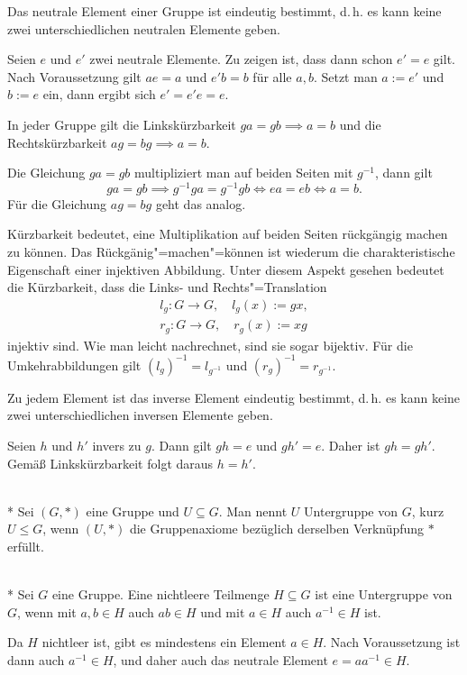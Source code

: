 \begin{Satz} Das neutrale Element einer Gruppe ist eindeutig bestimmt,
d.\,h. es kann keine zwei unterschiedlichen neutralen Elemente geben.
\end{Satz}
 Seien $e$ und $e'$ zwei neutrale Elemente.
Zu zeigen ist, dass dann schon $e'=e$ gilt. Nach Voraussetzung
gilt $ae=a$ und $e'b=b$ für alle $a,b$. Setzt man $a:=e'$ und
$b:=e$ ein, dann ergibt sich $e' = e'e = e.$\;\qedsymbol

\begin{Satz}
In jeder Gruppe gilt die Linkskürzbarkeit $ga=gb\implies a=b$
und die Rechtskürzbarkeit $ag=bg\implies a=b$.
\end{Satz}
 Die Gleichung $ga=gb$ multipliziert man auf beiden
Seiten mit $g^{-1}$, dann gilt
\[ga=gb \implies g^{-1}ga=g^{-1}gb \iff ea=eb \iff a=b.\]
Für die Gleichung $ag=bg$ geht das analog.\;\qedsymbol

Kürzbarkeit bedeutet, eine Multiplikation auf beiden Seiten
rückgängig machen zu können. Das Rückgänig"=machen"=können
ist wiederum die charakteristische Eigenschaft einer injektiven
Abbildung. Unter diesem Aspekt gesehen bedeutet die Kürzbarkeit,
dass die Links- und Rechts"=Translation
\begin{gather}
\label{eq:ltrans} l_g\colon G\to G,\quad l_g(x):=gx,\\
\label{eq:rtrans} r_g\colon G\to G,\quad r_g(x):=xg
\end{gather}
injektiv sind. Wie man leicht nachrechnet, sind sie sogar bijektiv.
Für die Umkehrabbildungen gilt $(l_g)^{-1}=l_{g^{-1}}$ und
$(r_g)^{-1}=r_{g^{-1}}$.

\begin{Satz} Zu jedem Element ist das inverse Element eindeutig
bestimmt, d.\,h. es kann keine zwei unterschiedlichen inversen
Elemente geben.
\end{Satz}
 Seien $h$ und $h'$ invers zu $g$. Dann gilt
$gh=e$ und $gh'=e$. Daher ist $gh=gh'$. Gemäß Linkskürzbarkeit
folgt daraus $h=h'$.\;\qedsymbol

\begin{Definition}[Untergruppe]\mbox{}\\*
Sei $(G,*)$ eine Gruppe und $U\subseteq G$.
Man nennt $U$ Untergruppe von $G$, kurz $U\le G$, wenn
$(U,*)$ die Gruppenaxiome bezüglich derselben Verknüpfung $*$
erfüllt.
\end{Definition}

\begin{Satz}[Untergruppenkriterium]\mbox{}\\*
Sei $G$ eine Gruppe. Eine nichtleere Teilmenge $H\subseteq G$ ist eine
Untergruppe von $G$, wenn mit $a,b\in H$ auch $ab\in H$ und
mit $a\in H$ auch $a^{-1}\in H$ ist.
\end{Satz}
Da $H$ nichtleer ist, gibt es mindestens ein
Element $a\in H$. Nach Voraussetzung ist dann auch $a^{-1}\in H$,
und daher auch das neutrale Element $e=aa^{-1}\in H$.

